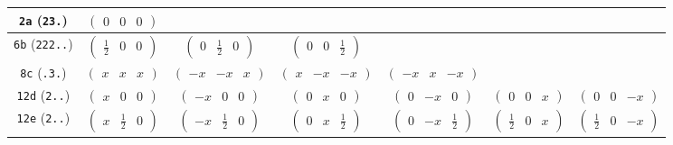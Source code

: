 \documentclass[fleqn,9pt,landscape]{jsarticle}
\begin{document}
\begin{center}
\begin{longtable}{ccccccc}
{\tt 2a} ({\tt 23.}) & $ \begin{pmatrix} 0 & 0 & 0 \end{pmatrix} $ & $  $ & $  $ & $  $ & $  $ & $  $ \\ \hline
{\tt 6b} ({\tt 222..}) & $ \begin{pmatrix} \frac{1}{2} & 0 & 0 \end{pmatrix} $ & $ \begin{pmatrix} 0 & \frac{1}{2} & 0 \end{pmatrix} $ & $ \begin{pmatrix} 0 & 0 & \frac{1}{2} \end{pmatrix} $ & $  $ & $  $ & $  $ \\ \hline
{\tt 8c} ({\tt .3.}) & $ \begin{pmatrix} x & x & x \end{pmatrix} $ & $ \begin{pmatrix} - x & - x & x \end{pmatrix} $ & $ \begin{pmatrix} x & - x & - x \end{pmatrix} $ & $ \begin{pmatrix} - x & x & - x \end{pmatrix} $ & $  $ & $  $ \\ \hline
{\tt 12d} ({\tt 2..}) & $ \begin{pmatrix} x & 0 & 0 \end{pmatrix} $ & $ \begin{pmatrix} - x & 0 & 0 \end{pmatrix} $ & $ \begin{pmatrix} 0 & x & 0 \end{pmatrix} $ & $ \begin{pmatrix} 0 & - x & 0 \end{pmatrix} $ & $ \begin{pmatrix} 0 & 0 & x \end{pmatrix} $ & $ \begin{pmatrix} 0 & 0 & - x \end{pmatrix} $ \\ \hline
{\tt 12e} ({\tt 2..}) & $ \begin{pmatrix} x & \frac{1}{2} & 0 \end{pmatrix} $ & $ \begin{pmatrix} - x & \frac{1}{2} & 0 \end{pmatrix} $ & $ \begin{pmatrix} 0 & x & \frac{1}{2} \end{pmatrix} $ & $ \begin{pmatrix} 0 & - x & \frac{1}{2} \end{pmatrix} $ & $ \begin{pmatrix} \frac{1}{2} & 0 & x \end{pmatrix} $ & $ \begin{pmatrix} \frac{1}{2} & 0 & - x \end{pmatrix} $ \\ \hline

\end{longtable}
\end{center}
\end{document}
